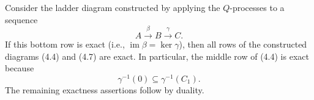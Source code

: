 \begin{theorem}[Theorem 4.4]
Consider the ladder diagram constructed by applying the $Q$-processes to a sequence
\[
A \xrightarrow{\beta} B \xrightarrow{\gamma} C.
\]
If this bottom row is exact (i.e., $\operatorname{im}\beta = \ker\gamma$), then all rows of the constructed diagrams (4.4) and (4.7) are exact. In particular, the middle row of (4.4) is exact because
\[
\gamma^{-1}(0) \subseteq \gamma^{-1}(C_1).
\]
The remaining exactness assertions follow by duality.
\end{theorem}
